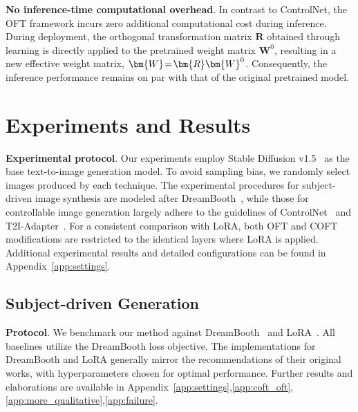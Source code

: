 {\textbf{No inference-time computational overhead}. In contrast to ControlNet, the OFT framework incurs zero additional computational cost during inference. During deployment, the orthogonal transformation matrix $\bm{R}$ obtained through learning is directly applied to the pretrained weight matrix $\bm{W}^0$, resulting in a new effective weight matrix, $\thickmuskip=2mu \medmuskip=2mu \bm{W}=\bm{R}\bm{W}^0$. Consequently, the inference performance remains on par with that of the original pretrained model.

\section{Experiments and Results}

\textbf{Experimental protocol}. Our experiments employ Stable Diffusion v1.5~\cite{rombach2022high} as the base text-to-image generation model. To avoid sampling bias, we randomly select images produced by each technique. The experimental procedures for subject-driven image synthesis are modeled after DreamBooth~\cite{ruiz2023dreambooth}, while those for controllable image generation largely adhere to the guidelines of ControlNet~\cite{zhang2023adding} and T2I-Adapter~\cite{mou2023t2i}. For a consistent comparison with LoRA, both OFT and COFT modifications are restricted to the identical layers where LoRA is applied. Additional experimental results and detailed configurations can be found in Appendix~\ref{app:settings}.

\subsection{Subject-driven Generation}

\textbf{Protocol}. We benchmark our method against DreamBooth~\cite{ruiz2023dreambooth} and LoRA~\cite{hulora2022}. All baselines utilize the DreamBooth loss objective. The implementations for DreamBooth and LoRA generally mirror the recommendations of their original works, with hyperparameters chosen for optimal performance. Further results and elaborations are available in Appendix~\ref{app:settings},\ref{app:coft_oft},\ref{app:more_qualitative},\ref{app:failure}.

}
